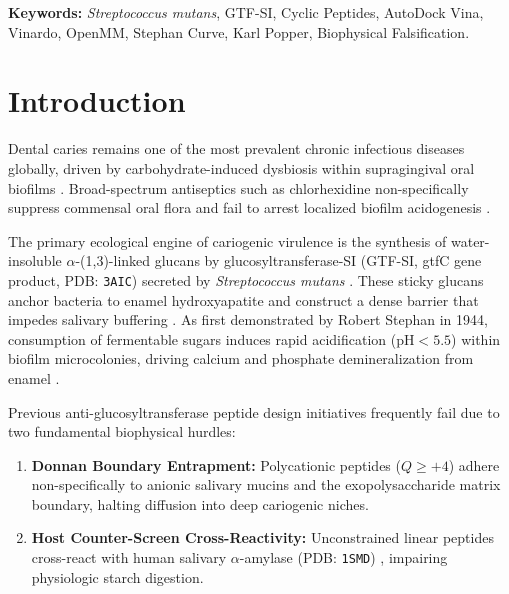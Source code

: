 \documentclass[11pt,a4paper]{article}
\begin{document}
\begin{abstract}
\textbf{Conclusions:} Stephan-selective cyclic peptide macrocycles provide a computationally corroborated anti-virulence hypothesis. However, all findings are strictly in silico computational predictions requiring wet-lab enzymatic, whole human saliva, and cellular biofilm falsification prior to translational claims.
\end{abstract}

\vspace{0.5em}
\noindent\textbf{Keywords:} \textit{Streptococcus mutans}, GTF-SI, Cyclic Peptides, AutoDock Vina, Vinardo, OpenMM, Stephan Curve, Karl Popper, Biophysical Falsification.

\section{Introduction}

Dental caries remains one of the most prevalent chronic infectious diseases globally, driven by carbohydrate-induced dysbiosis within supragingival oral biofilms \cite{Bowen2018, Marsh2004}. Broad-spectrum antiseptics such as chlorhexidine non-specifically suppress commensal oral flora and fail to arrest localized biofilm acidogenesis \cite{Scharnow2019}.

The primary ecological engine of cariogenic virulence is the synthesis of water-insoluble $\alpha$-(1,3)-linked glucans by glucosyltransferase-SI (GTF-SI, gtfC gene product, PDB: \texttt{3AIC}) secreted by \textit{Streptococcus mutans} \cite{Ito2011, Koo2013}. These sticky glucans anchor bacteria to enamel hydroxyapatite and construct a dense barrier that impedes salivary buffering \cite{Xiao2012}. As first demonstrated by Robert Stephan in 1944, consumption of fermentable sugars induces rapid acidification ($\text{pH} < 5.5$) within biofilm microcolonies, driving calcium and phosphate demineralization from enamel \cite{Stephan1944, Zero2004, Burne2000}.

Previous anti-glucosyltransferase peptide design initiatives frequently fail due to two fundamental biophysical hurdles:
\begin{enumerate}
    \item \textbf{Donnan Boundary Entrapment:} Polycationic peptides ($Q \ge +4$) adhere non-specifically to anionic salivary mucins and the exopolysaccharide matrix boundary, halting diffusion into deep cariogenic niches.
    \item \textbf{Host Counter-Screen Cross-Reactivity:} Unconstrained linear peptides cross-react with human salivary $\alpha$-amylase (PDB: \texttt{1SMD}) \cite{Ramasubbu1996}, impairing physiologic starch digestion.
\end{enumerate}
\end{document}
